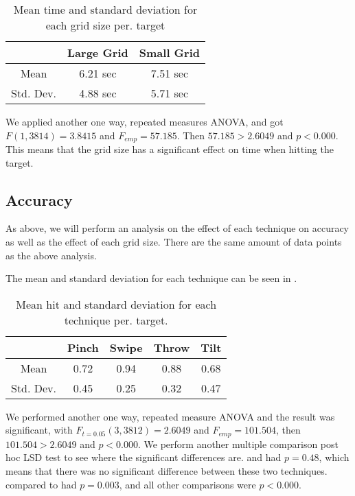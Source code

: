 \begin{table}[H]
	\centering
	\begin{tabular}{|c|c|c|}
		\hline
		\rowcolor[HTML]{9B9B9B} 
		 & \textbf{Large Grid} & \textbf{Small Grid} \\ \hline
		Mean & 6.21 sec & 7.51 sec \\ \hline
		Std. Dev. & 4.88 sec & 5.71 sec \\ \hline
	\end{tabular}
	\caption{Mean time and standard deviation for each grid size per. target}
	\label{tab:meanTimesSize}
\end{table}

We applied another one way, repeated measures ANOVA, and got $F(1,3814)=3.8415$ and $F_{emp}=57.185$. Then $57.185 > 2.6049$ and $p<0.000$. This means that the grid size has a significant effect on time when hitting the target. 

\subsection{Accuracy}

As above, we will perform an analysis on the effect of each technique on accuracy as well as the effect of each grid size. There are the same amount of data points as the above analysis. 

The mean and standard deviation for each technique can be seen in . 

\begin{table}[H]
	\centering
	\begin{tabular}{|c|c|c|c|c|}
			\hline
			\rowcolor[HTML]{9B9B9B} 
			& \textbf{Pinch} & \textbf{Swipe} & \textbf{Throw} & \textbf{Tilt} \\ \hline
			Mean & 0.72         & 0.94          & 0.88          & 0.68         \\ \hline
			Std. Dev. & 0.45 & 0.25 & 0.32 & 0.47 \\ \hline
	\end{tabular}
	\caption{Mean hit  and standard deviation for each technique per. target.}
	\label{tab:meanHitTechnique}
\end{table}

We performed another one way, repeated measure ANOVA and the result was significant, with $F_{t=0.05}(3,3812)= 2.6049$ and $F_{emp}=101.504$, then $101.504 > 2.6049$ and $p<0.000$. We perform another multiple comparison post hoc LSD test to see where the significant differences are. \pinch and \tilt had $p=0.48$, which means that there was no significant difference between these two techniques. \swipe compared to \throw had $p=0.003$, and all other comparisons were $p<0.000$. 

